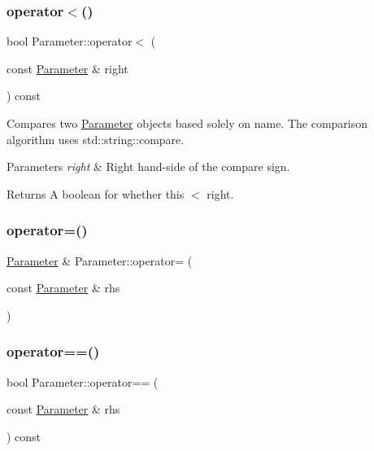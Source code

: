 \subsubsection{\texorpdfstring{operator$<$()}{operator<()}}
{\footnotesize\ttfamily bool Parameter\+::operator$<$ (\begin{DoxyParamCaption}\item[{const \mbox{\hyperlink{class_parameter}{Parameter}} \&}]{right }\end{DoxyParamCaption}) const}

Compares two \mbox{\hyperlink{class_parameter}{Parameter}} objects based solely on name. The comparison algorithm uses std\+::string\+::compare.


\begin{DoxyParams}{Parameters}
{\em right} & Right hand-\/side of the compare sign. \\
\hline
\end{DoxyParams}
\begin{DoxyReturn}{Returns}
A boolean for whether this $<$ right. 
\end{DoxyReturn}
\mbox{\label{class_parameter_a3bd55c637ccb3891e09cfa4a6bec91f5}} 
\subsubsection{\texorpdfstring{operator=()}{operator=()}}
{\footnotesize\ttfamily \mbox{\hyperlink{class_parameter}{Parameter}} \& Parameter\+::operator= (\begin{DoxyParamCaption}\item[{const \mbox{\hyperlink{class_parameter}{Parameter}} \&}]{rhs }\end{DoxyParamCaption})}

\mbox{\label{class_parameter_ada4106ab9962e61d1aecf5bf032290c3}} 
\subsubsection{\texorpdfstring{operator==()}{operator==()}}
{\footnotesize\ttfamily bool Parameter\+::operator== (\begin{DoxyParamCaption}\item[{const \mbox{\hyperlink{class_parameter}{Parameter}} \&}]{rhs }\end{DoxyParamCaption}) const}

